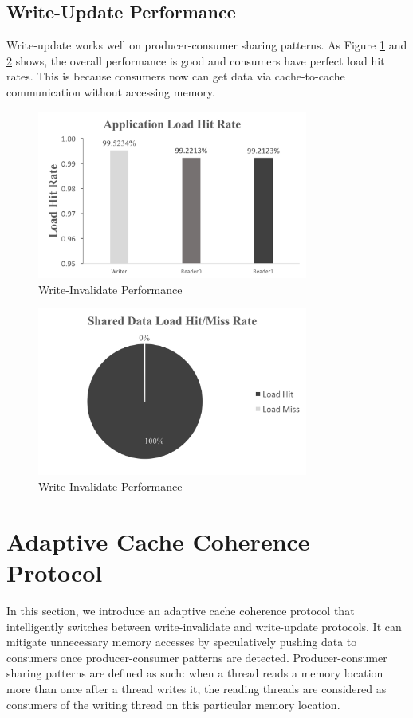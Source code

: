 \documentclass[conference]{IEEEtran}
\begin{document}
\subsection{Write-Update Performance}
Write-update works well on producer-consumer sharing patterns. As Figure \ref{write_update} and \ref{write_update_1} shows, the overall performance is good and consumers have perfect load hit rates. This is because consumers now can get data via cache-to-cache communication without accessing memory.

\begin{figure}[!h]
\centering
\includegraphics[width=3.5in]{write_update.png}
\caption{Write-Invalidate Performance}
\label{write_update}
\end{figure}
\FloatBarrier

\begin{figure}[!h]
\centering
\includegraphics[width=3.5in]{write_update_1.png}
\caption{Write-Invalidate Performance}
\label{write_update_1}
\end{figure}
\FloatBarrier

\newpage

\section{Adaptive Cache Coherence Protocol}
In this section, we introduce an adaptive cache coherence protocol that intelligently switches between write-invalidate and write-update protocols. It can mitigate unnecessary memory accesses by speculatively pushing data to consumers once producer-consumer patterns are detected. Producer-consumer sharing patterns are defined as such: when a thread reads a memory location more than once after a thread writes it, the reading threads are considered as consumers of the writing thread on this particular memory location.
\end{document}
